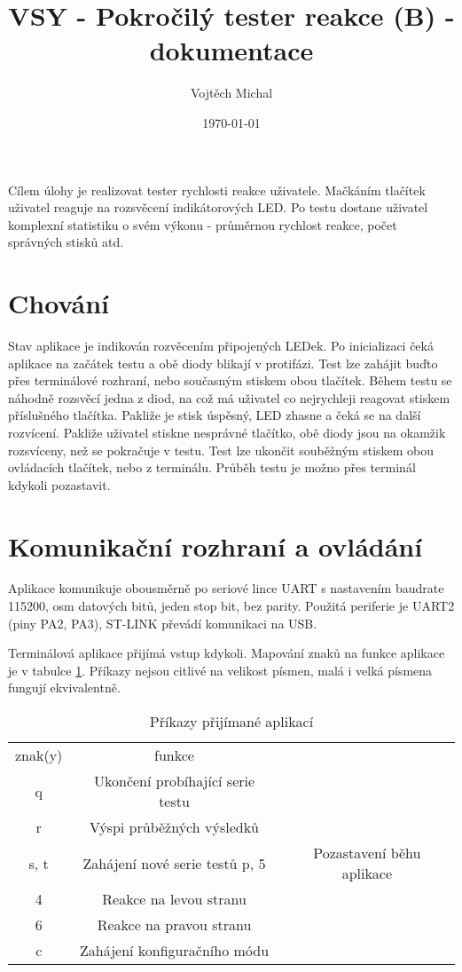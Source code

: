 \documentclass[twoside]{article}
\title{VSY - Pokročilý tester reakce (B) - dokumentace}
\author{Vojtěch Michal}
\date{\today}
\begin{document}
\maketitle

Cílem úlohy je realizovat tester rychlosti reakce uživatele. Mačkáním tlačítek uživatel reaguje na rozsvěcení indikátorových LED.
Po testu dostane uživatel komplexní statistiku o svém výkonu - průměrnou rychlost reakce, počet správných stisků atd.

\section{Chování}
\label{sec:chovani}

Stav aplikace je indikován rozvěcením připojených LEDek. Po inicializaci čeká aplikace
na začátek testu a obě diody blikají v protifázi. Test lze zahájit buďto přes terminálové
rozhraní, nebo současným stiskem obou tlačítek. Během testu se náhodně rozsvěcí jedna z diod,
na což má uživatel co nejrychleji reagovat stiskem příslušného tlačítka. Pakliže je stisk úspěsný,
LED zhasne a čeká se na další rozvícení. Pakliže uživatel stiskne nesprávné tlačítko, obě diody 
jsou na okamžik rozsvíceny, než se pokračuje v testu. Test lze ukončit souběžným stiskem obou
ovládacích tlačítek, nebo z terminálu. Průběh testu je možno přes terminál kdykoli pozastavit.

\section{Komunikační rozhraní a ovládání}

Aplikace komunikuje obousměrně po seriové lince UART s nastavením baudrate 115200,
osm datových bitů, jeden stop bit, bez parity. Použitá periferie je UART2 (piny PA2, PA3),
ST-LINK převádí komunikaci na USB.

Terminálová aplikace přijímá vstup kdykoli. Mapování znaků na funkce aplikace je v tabulce \ref{table:commands}.
Příkazy nejsou citlivé na velikost písmen, malá i velká písmena fungují ekvivalentně.

\begin{table}[htbp]
    \centering
    \begin{tabular}{c|c|c}
        znak(y) & funkce \\
        q & Ukončení probíhající serie testu \\
        r & Výspi průběžných výsledků \\
        s, t & Zahájení nové serie testů
        p, 5 & Pozastavení běhu aplikace \\
        4 & Reakce na levou stranu \\
        6 & Reakce na pravou stranu \\
        c & Zahájení konfiguračního módu
    \end{tabular}
    \caption{Příkazy přijímané aplikací}
    \label{table:commands}
\end{table}
\end{document}
